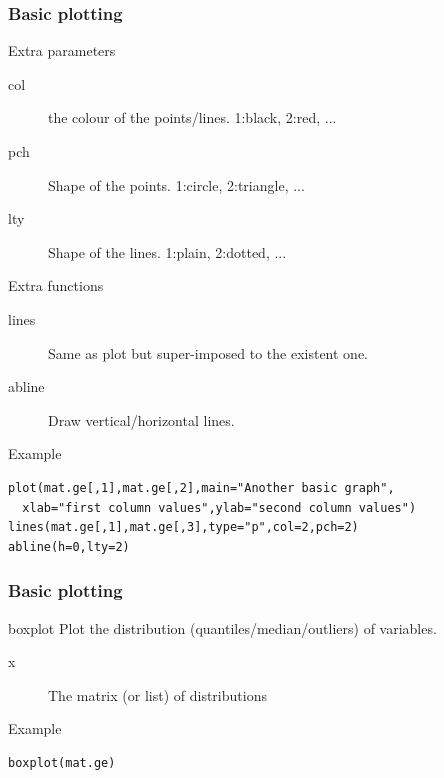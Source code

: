 \documentclass[10pt]{beamer}
\newenvironment{xframe}[2][]
  {\begin{frame}[fragile,environment=xframe,#1]
  \frametitle{#2}}
  {\end{frame}}
\begin{document}

\begin{xframe}{Basic plotting}
  \begin{block}{Extra parameters}
    \begin{description}
      \item[col] the colour of the points/lines. 1:black, 2:red, ...
      \item[pch] Shape of the points. 1:circle, 2:triangle, ...
      \item[lty] Shape of the lines. 1:plain, 2:dotted, ...
    \end{description}
  \end{block}
  \begin{block}{Extra functions}
    \begin{description}
      \item[lines] Same as plot but super-imposed to the existent one.
      \item[abline] Draw vertical/horizontal lines.  
    \end{description}
  \end{block}
  \begin{exampleblock}{Example}
\begin{verbatim}
plot(mat.ge[,1],mat.ge[,2],main="Another basic graph",
  xlab="first column values",ylab="second column values")
lines(mat.ge[,1],mat.ge[,3],type="p",col=2,pch=2)
abline(h=0,lty=2)
\end{verbatim}  
  \end{exampleblock}
\end{xframe}



\begin{xframe}{Basic plotting}
  \begin{block}{{\sf boxplot}}
    Plot the distribution (quantiles/median/outliers) of variables.
    \begin{description}
    \item[x] The matrix (or list) of distributions
    \end{description}
  \end{block}
  \begin{exampleblock}{Example}
\begin{verbatim}
boxplot(mat.ge)
\end{verbatim}  
  \end{exampleblock}
\end{xframe}
\end{document}
